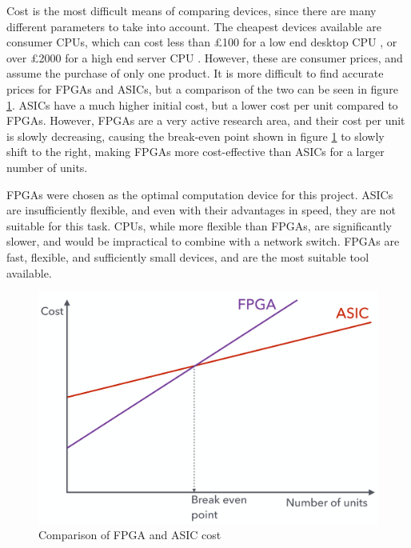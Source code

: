 Cost is the most difficult means of comparing devices, since there are many different parameters to take into account. The cheapest devices available are consumer CPUs, which can cost less than £100 for a low end desktop CPU \cite{scan_celeron_g4900} \cite{intel_celeron_g4900}, or over £2000 for a high end server CPU \cite{scan_xeon_gold_6132} \cite{intel_xeon_gold_6132}.
However, these are consumer prices, and assume the purchase of only one product.
It is more difficult to find accurate prices for FPGAs and ASICs, but a comparison of the two can be seen in figure \ref{fpga_asic_cost_tradeoff}. ASICs have a much higher initial cost, but a lower cost per unit compared to FPGAs.
However, FPGAs are a very active research area, and their cost per unit is slowly decreasing, causing the break-even point shown in figure \ref{fpga_asic_cost_tradeoff} to slowly shift to the right, making FPGAs more cost-effective than ASICs for a larger number of units.

FPGAs were chosen as the optimal computation device for this project. ASICs are insufficiently flexible, and even with their advantages in speed, they are not suitable for this task. CPUs, while more flexible than FPGAs, are significantly slower, and would be impractical to combine with a network switch. FPGAs are fast, flexible, and sufficiently small devices, and are the most suitable tool available.

\begin{figure}[ht!]
  \centering
  \includegraphics[width=\textwidth]{assets/fpga_asic_cost_tradeoff.png}
  \caption{Comparison of FPGA and ASIC cost \cite{es3b2}}
  \label{fpga_asic_cost_tradeoff}
\end{figure}


